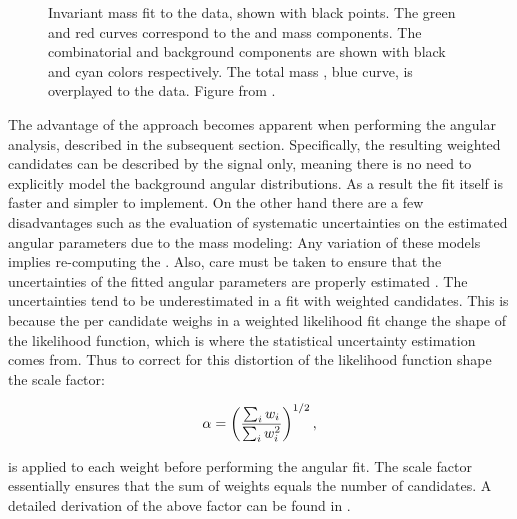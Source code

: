 \begin{figure}[t]
  \centering
  \scalebox{0.5}{}
  \caption{Invariant mass fit to the data, shown with black points. The green and red curves correspond to the \BdJpsiKst and
           \BsJpsiKst mass \pdf components. The combinatorial and \LbJpsippi background components are shown with black and cyan
           colors respectively. The total mass \pdf, blue curve, is overplayed to the data. Figure from \cite{bsjpsikst-paper}. }
  \label{mass_plot}
\end{figure}

The advantage of the \sWeights approach becomes apparent when performing the angular analysis, described in the subsequent section.
Specifically, the resulting weighted candidates can be described by the signal \pdf only, meaning there is no need to explicitly model
the background angular distributions. As a result the fit itself is faster and simpler to implement. On the other hand there are a few
disadvantages such as the evaluation of systematic uncertainties on the estimated angular parameters due to the mass \pdf modeling:
Any variation of these models implies re-computing the \sWeights. Also, care must be taken to ensure that the uncertainties
of the fitted angular parameters are properly estimated \cite{splot}. The uncertainties tend to be underestimated in a fit
with weighted candidates. This is because the per candidate weighs in a weighted likelihood fit change the shape of the
likelihood function, which is where the statistical uncertainty estimation comes from.
Thus to correct for this distortion of the likelihood function shape the scale factor:

\begin{equation}
  \centering
  \alpha = \left(\frac{\sum_{i} w_i}{\sum_{i} w_i^2}\right)^{1/2},
  \label{sWeights_scale_factor}
\end{equation}

\noindent is applied to each weight before performing the angular fit. The scale factor essentially ensures that the sum of weights
equals the number of candidates. A detailed derivation of the above factor can be found in \cite{jeroenThesis}.
